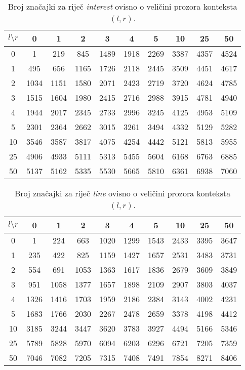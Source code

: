 \documentclass[10pt, a4paper]{article}
\begin{document}
\begin{table*}[!hbtp]
\caption{Broj značajki za riječ \emph{interest} ovisno o veličini prozora konteksta $(l,r)$.}
\label{tab:interest_feature_set}
\begin{center}
\begin{tabular}{|c|ccccccccc|}
\hline
$l \setminus r$ & 0 & 1 & 2 & 3 & 4 & 5 & 10 & 25 & 50 \\
\hline
0 &  1 &  219 &  845 &  1489 &  1918 &  2269 &  3387 &  4357 &  4524 \\
1 &  495 &  656 &  1165 &  1726 &  2118 &  2445 &  3509 &  4451 &  4617\\
2 &  1034 &  1151 &  1580 &  2071 &  2423 &  2719 &  3720 &  4624 &  4785\\
3 &  1515 &  1604 &  1980 &  2415 &  2716 &  2988 &  3915 &  4781 &  4940\\
4 &  1944 &  2017 &  2345 &  2733 &  2996 &  3245 &  4125 &  4953 &  5109\\
5 &  2301 &  2364 &  2662 &  3015 &  3261 &  3494 &  4332 &  5129 &  5282\\
10 &  3546 &  3587 &  3817 &  4075 &  4254 &  4442 &  5121 &  5813 &  5955\\
25 &  4906 &  4933 &  5111 &  5313 &  5455 &  5604 &  6168 &  6763 &  6885\\
50 &  5137 &  5162 &  5335 &  5530 &  5665 &  5810 &  6361 &  6938 &  7060\\
\hline
\end{tabular}
\end{center}
\end{table*}

\begin{table*}[!hbtp]
\caption{Broj značajki za riječ \emph{line} ovisno o veličini prozora konteksta $(l,r)$.}
\label{tab:line_feature_set}
\begin{center}
\begin{tabular}{|c|ccccccccc|}
\hline
$l \setminus r$ & 0 & 1 & 2 & 3 & 4 & 5 & 10 & 25 & 50 \\
\hline
0  &  1 &  224 &  663 &  1020 &  1299 &  1543 &  2433 &  3395 &  3647\\
1  &  235 &  422 &  825 &  1159 &  1427 &  1657 &  2531 &  3483 &  3731\\
2  &  554 &  691 &  1053 &  1363 &  1617 &  1836 &  2679 &  3609 &  3849\\
3  &  951 &  1058 &  1377 &  1657 &  1898 &  2109 &  2907 &  3803 &  4037\\
4  &  1326 &  1416 &  1703 &  1959 &  2186 &  2384 &  3143 &  4002 &  4231\\
5  &  1683 &  1766 &  2030 &  2267 &  2478 &  2659 &  3378 &  4198 &  4412\\
10 &  3185 &  3244 &  3447 &  3620 &  3783 &  3927 &  4494 &  5166 &  5346\\
25 &  5789 &  5828 &  5970 &  6094 &  6203 &  6296 &  6721 &  7205 &  7359\\
50 &  7046 &  7082 &  7205 &  7315 &  7408 &  7491 &  7854 &  8271 &  8406\\
\hline
\end{tabular}
\end{center}
\end{table*}
\end{document}
